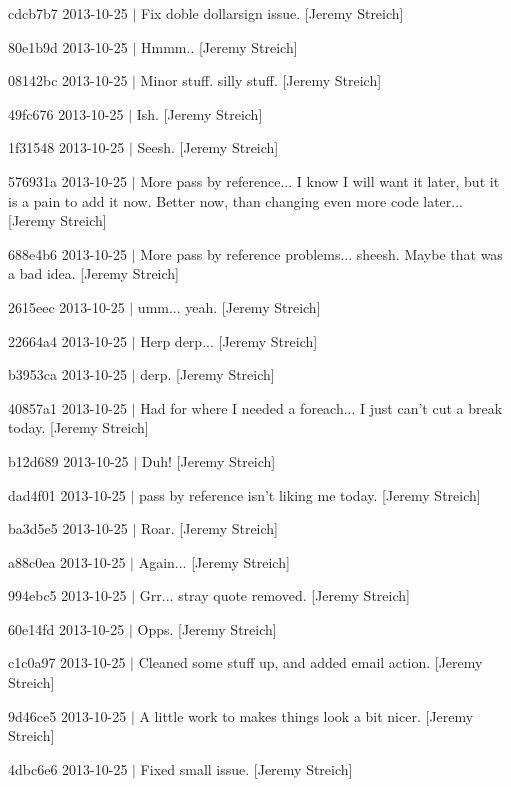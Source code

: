 \begin{DoxyItemize}
\item cdcb7b7 2013-\/10-\/25 $|$ Fix doble dollarsign issue. \mbox{[}Jeremy Streich\mbox{]}
\item 80e1b9d 2013-\/10-\/25 $|$ Hmmm.. \mbox{[}Jeremy Streich\mbox{]}
\item 08142bc 2013-\/10-\/25 $|$ Minor stuff. silly stuff. \mbox{[}Jeremy Streich\mbox{]}
\item 49fc676 2013-\/10-\/25 $|$ Ish. \mbox{[}Jeremy Streich\mbox{]}
\item 1f31548 2013-\/10-\/25 $|$ Seesh. \mbox{[}Jeremy Streich\mbox{]}
\item 576931a 2013-\/10-\/25 $|$ More pass by reference... I know I will want it later, but it is a pain to add it now. Better now, than changing even more code later... \mbox{[}Jeremy Streich\mbox{]}
\item 688e4b6 2013-\/10-\/25 $|$ More pass by reference problems... sheesh. Maybe that was a bad idea. \mbox{[}Jeremy Streich\mbox{]}
\item 2615eec 2013-\/10-\/25 $|$ umm... yeah. \mbox{[}Jeremy Streich\mbox{]}
\item 22664a4 2013-\/10-\/25 $|$ Herp derp... \mbox{[}Jeremy Streich\mbox{]}
\item b3953ca 2013-\/10-\/25 $|$ derp. \mbox{[}Jeremy Streich\mbox{]}
\item 40857a1 2013-\/10-\/25 $|$ Had for where I needed a foreach... I just can't cut a break today. \mbox{[}Jeremy Streich\mbox{]}
\item b12d689 2013-\/10-\/25 $|$ Duh! \mbox{[}Jeremy Streich\mbox{]}
\item dad4f01 2013-\/10-\/25 $|$ pass by reference isn't liking me today. \mbox{[}Jeremy Streich\mbox{]}
\item ba3d5e5 2013-\/10-\/25 $|$ Roar. \mbox{[}Jeremy Streich\mbox{]}
\item a88c0ea 2013-\/10-\/25 $|$ Again... \mbox{[}Jeremy Streich\mbox{]}
\item 994ebc5 2013-\/10-\/25 $|$ Grr... stray quote removed. \mbox{[}Jeremy Streich\mbox{]}
\item 60e14fd 2013-\/10-\/25 $|$ Opps. \mbox{[}Jeremy Streich\mbox{]}
\item c1c0a97 2013-\/10-\/25 $|$ Cleaned some stuff up, and added email action. \mbox{[}Jeremy Streich\mbox{]}
\item 9d46ce5 2013-\/10-\/25 $|$ A little work to makes things look a bit nicer. \mbox{[}Jeremy Streich\mbox{]}
\item 4dbc6e6 2013-\/10-\/25 $|$ Fixed small issue. \mbox{[}Jeremy Streich\mbox{]}

\end{DoxyItemize}
